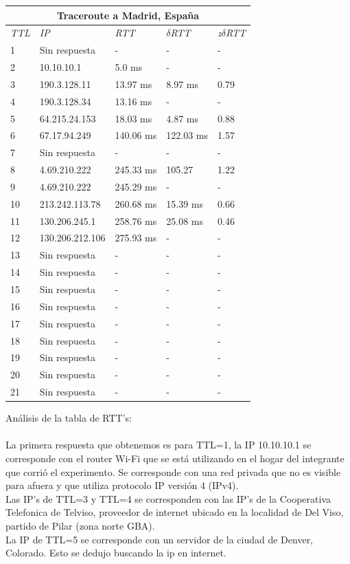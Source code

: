 \begin{tabular}{ |p{2cm}||p{3cm}|p{3cm}|p{3cm}|p{3cm}|   }
 \hline
 \multicolumn{5}{|c|}{Traceroute a Madrid, España} \\
 \hline
 \textit{TTL} & \textit{IP}  & \textit{RTT} & $\delta$\textit{RTT} & \textit{z}$\delta$\textit{RTT}\\
 \hline
 1   & Sin respuesta  & - &   - & -\\
 2   & 10.10.10.1 & 5.0 ms &   - & -\\
 3   & 190.3.128.11  & 13.97 ms & 8.97 ms & 0.79  \\
 4   & 190.3.128.34   & 13.16 ms &   - & -\\	
 5   & 64.215.24.153  & 18.03 ms &  4.87 ms & 0.88\\
 6   &  67.17.94.249 & 140.06 ms &  122.03 ms & 1.57\\
 7   & Sin respuesta  & - &  - & -\\
 8   & 4.69.210.222  & 245.33 ms & 105.27 &  1.22\\
 9   & 4.69.210.222 & 245.29 ms &  - & -\\
 10   & 213.242.113.78   & 260.68 ms & 15.39 ms & 0.66\\
 11   & 130.206.245.1   & 258.76 ms & 25.08 ms & 0.46\\
 12   & 130.206.212.106  & 275.93 ms &  - & -\\
 13   & Sin respuesta  & - & - & -\\
 14   & Sin respuesta  & - & - & -\\
 15   & Sin respuesta  & - & - & -\\
 16   & Sin respuesta  & - & - & -\\
 17   & Sin respuesta  & - & - & -\\
 18   & Sin respuesta  & - & - & -\\
 19   & Sin respuesta  & - & - & -\\
 20   & Sin respuesta  & - & - & -\\
 21   & Sin respuesta  & - & - & -\\
 \hline
\end{tabular}


Análisis de la tabla de RTT's: \\ \\

La primera respuesta que obtenemos es para TTL=1, la IP 10.10.10.1 se corresponde con el router Wi-Fi que se está utilizando en el hogar del 
integrante que corrió el experimento. Se corresponde con una red privada que no es visible para afuera y que utiliza protocolo IP versión 4 (IPv4). \\
Las IP's de TTL=3 y TTL=4 se corresponden con las IP's de la Cooperativa Telefonica de Telviso, proveedor de internet ubicado en 
la localidad de Del Viso, partido de Pilar (zona norte GBA). \\
La IP de TTL=5 se corresponde con un servidor de la ciudad de Denver, Colorado. Esto se dedujo buscando la ip en internet. \\






